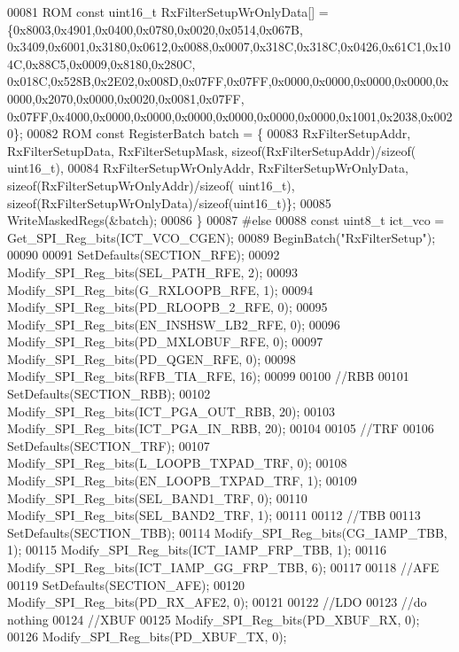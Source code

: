 \begin{DoxyCode}
00081         ROM \textcolor{keyword}{const} uint16\_t RxFilterSetupWrOnlyData[] = \{0x8003,0x4901,0x0400,0x0780,0x0020,0x0514,0x067B,
      0x3409,0x6001,0x3180,0x0612,0x0088,0x0007,0x318C,0x318C,0x0426,0x61C1,0x104C,0x88C5,0x0009,0x8180,0x280C,
      0x018C,0x528B,0x2E02,0x008D,0x07FF,0x07FF,0x0000,0x0000,0x0000,0x0000,0x0000,0x2070,0x0000,0x0020,0x0081,0x07FF,
      0x07FF,0x4000,0x0000,0x0000,0x0000,0x0000,0x0000,0x0000,0x1001,0x2038,0x0020\};
00082         ROM \textcolor{keyword}{const} RegisterBatch batch = \{
00083             RxFilterSetupAddr, RxFilterSetupData, RxFilterSetupMask, \textcolor{keyword}{sizeof}(RxFilterSetupAddr)/\textcolor{keyword}{sizeof}(
      uint16\_t),
00084             RxFilterSetupWrOnlyAddr, RxFilterSetupWrOnlyData, \textcolor{keyword}{sizeof}(RxFilterSetupWrOnlyAddr)/\textcolor{keyword}{sizeof}(
      uint16\_t), \textcolor{keyword}{sizeof}(RxFilterSetupWrOnlyData)/\textcolor{keyword}{sizeof}(uint16\_t)\};
00085         WriteMaskedRegs(&batch);
00086     \}
00087 \textcolor{preprocessor}{#else}
00088     \textcolor{keyword}{const} uint8\_t ict\_vco = Get_SPI_Reg_bits(ICT_VCO_CGEN);
00089     BeginBatch(\textcolor{stringliteral}{"RxFilterSetup"});
00090 
00091     SetDefaults(SECTION_RFE);
00092     Modify_SPI_Reg_bits(SEL_PATH_RFE, 2);
00093     Modify_SPI_Reg_bits(G_RXLOOPB_RFE, 1);
00094     Modify_SPI_Reg_bits(PD_RLOOPB_2_RFE, 0);
00095     Modify_SPI_Reg_bits(EN_INSHSW_LB2_RFE, 0);
00096     Modify_SPI_Reg_bits(PD_MXLOBUF_RFE, 0);
00097     Modify_SPI_Reg_bits(PD_QGEN_RFE, 0);
00098     Modify_SPI_Reg_bits(RFB_TIA_RFE, 16);
00099 
00100     \textcolor{comment}{//RBB}
00101     SetDefaults(SECTION_RBB);
00102     Modify_SPI_Reg_bits(ICT_PGA_OUT_RBB, 20);
00103     Modify_SPI_Reg_bits(ICT_PGA_IN_RBB, 20);
00104 
00105     \textcolor{comment}{//TRF}
00106     SetDefaults(SECTION_TRF);
00107     Modify_SPI_Reg_bits(L_LOOPB_TXPAD_TRF, 0);
00108     Modify_SPI_Reg_bits(EN_LOOPB_TXPAD_TRF, 1);
00109     Modify_SPI_Reg_bits(SEL_BAND1_TRF, 0);
00110     Modify_SPI_Reg_bits(SEL_BAND2_TRF, 1);
00111 
00112     \textcolor{comment}{//TBB}
00113     SetDefaults(SECTION_TBB);
00114     Modify_SPI_Reg_bits(CG_IAMP_TBB, 1);
00115     Modify_SPI_Reg_bits(ICT_IAMP_FRP_TBB, 1);
00116     Modify_SPI_Reg_bits(ICT_IAMP_GG_FRP_TBB, 6);
00117 
00118     \textcolor{comment}{//AFE}
00119     SetDefaults(SECTION_AFE);
00120     Modify_SPI_Reg_bits(PD_RX_AFE2, 0);
00121 
00122     \textcolor{comment}{//LDO}
00123     \textcolor{comment}{//do nothing}
00124     \textcolor{comment}{//XBUF}
00125     Modify_SPI_Reg_bits(PD_XBUF_RX, 0);
00126     Modify_SPI_Reg_bits(PD_XBUF_TX, 0);

\end{DoxyCode}

